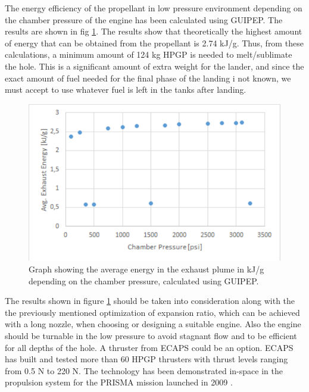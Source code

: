 \noindent
The energy efficiency of the propellant in low pressure environment depending on the chamber pressure of the engine has been calculated using GUIPEP. The results are shown in fig \ref{guigraf}. The results show that theoretically the highest amount of energy that can be obtained from the propellant is 2.74 kJ/g. Thus, from these calculations, a minimum amount of 124 kg HPGP is needed to melt/sublimate the hole.  This is a significant amount of extra weight for the lander, and since the exact amount of fuel needed for the final phase of the landing i not known, we must accept to use whatever fuel is left in the tanks after landing.\\
\begin{figure}[htb]
\begin{center}
\includegraphics[scale=0.8]{figures/navtheory/guigraf}
\caption{Graph showing the average energy in the exhaust plume in kJ/g depending on the chamber pressure, calculated using GUIPEP.}
\label{guigraf}
\end{center}
\end{figure}

\noindent
The results shown in figure \ref{guigraf} should be taken into consideration along with the the previously mentioned optimization of expansion ratio, which can be achieved with a long nozzle, when choosing or designing a suitable engine. Also the engine should be turnable in the low pressure to avoid stagnant flow and to be efficient for all depths of the hole. A thruster from ECAPS could be an option. ECAPS has built and tested more than 60 HPGP thrusters with thrust levels ranging from 0.5 N to 220 N. The technology has been demonstrated in-space in the propulsion system for the PRISMA mission launched in 2009 \cite{Walter_2014}.
